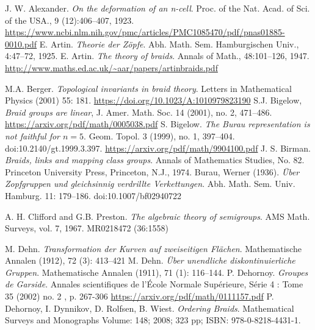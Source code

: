 \documentclass[TFG.tex]{subfiles}
\begin{document}
%

\begin{thebibliography}{}
 J. W. Alexander. \emph{On the deformation of an n-cell}. Proc. of the Nat.
Acad. of Sci. of the USA., 9 (12):406–407, 1923. \url{https://www.ncbi.nlm.nih.gov/pmc/articles/PMC1085470/pdf/pnas01885-0010.pdf}
 E. Artin. \emph{Theorie der Zöpfe}. Abh. Math. Sem. Hamburgischen Univ.,
4:47–72, 1925.
 E. Artin. \emph{The theory of braids}. Annals of Math., 48:101–126, 1947. \url{http://www.maths.ed.ac.uk/~aar/papers/artinbraids.pdf}

 M.A. Berger. \emph{Topological invariants in braid theory}.  Letters in Mathematical Physics (2001) 55: 181. \url{https://doi.org/10.1023/A:1010979823190}
 S.J. Bigelow, \emph{Braid groups are linear}, J. Amer. Math. Soc. 14 (2001), no. 2,
471–486. \url{https://arxiv.org/pdf/math/0005038.pdf}
 S. Bigelow. \emph{The Burau representation is not faithful for $n = 5$}. Geom. Topol. 3 (1999), no. 1, 397--404. doi:10.2140/gt.1999.3.397. 
\url{https://arxiv.org/pdf/math/9904100.pdf}
 J. S. Birman. \emph{Braids, links and mapping class groups}. Annals of Mathematics
Studies, No. 82. Princeton University Press, Princeton, N.J.,
1974.
 Burau, Werner (1936). \emph{Über Zopfgruppen und gleichsinnig verdrillte Verkettungen}. Abh. Math. Sem. Univ. Hamburg. 11: 179–186. doi:10.1007/bf02940722

  A. H. Clifford and G.B. Preston. \emph{The algebraic theory of semigroups}. AMS Math. Surveys,
vol. 7, 1967. MR0218472 (36:1558)

 M. Dehn. \emph{Transformation der Kurven auf zweiseitigen Flächen}. Mathematische Annalen (1912), 72 (3): 413–421
 M. Dehn. \emph{Über unendliche diskontinuierliche Gruppen}. Mathematische Annalen (1911), 71 (1): 116–144.
 P. Dehornoy. \emph{Groupes de Garside}. Annales scientifiques de l'École Normale Supérieure, Série 4 : Tome 35 (2002) no. 2 , p. 267-306 \url{https://arxiv.org/pdf/math/0111157.pdf}
 P. Dehornoy, I. Dynnikov, D. Rolfsen, B. Wiest. \emph{Ordering Braids}. Mathematical Surveys and Monographs
Volume: 148; 2008; 323 pp;  ISBN: 978-0-8218-4431-1.


\end{thebibliography}
\end{document}
